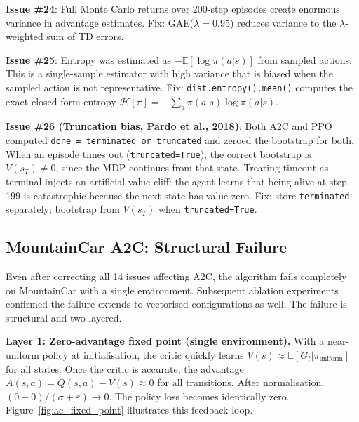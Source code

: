 \documentclass[a4paper,12pt]{article}
\begin{document}
\textbf{Issue \#24}: Full Monte Carlo returns over 200-step episodes create enormous variance in advantage estimates. Fix: GAE($\lambda=0.95$) reduces variance to the $\lambda$-weighted sum of TD errors.

\textbf{Issue \#25}: Entropy was estimated as $-\mathbb{E}[\log\pi(a|s)]$ from sampled actions. This is a single-sample estimator with high variance that is biased when the sampled action is not representative. Fix: \texttt{dist.entropy().mean()} computes the exact closed-form entropy $\mathcal{H}[\pi] = -\sum_a \pi(a|s)\log\pi(a|s)$.

\textbf{Issue \#26 (Truncation bias, Pardo et al., 2018)}: Both A2C and PPO computed \texttt{done = terminated or truncated} and zeroed the bootstrap for both. When an episode times out (\texttt{truncated=True}), the correct bootstrap is $V(s_T) \neq 0$, since the MDP continues from that state. Treating timeout as terminal injects an artificial value cliff: the agent learns that being alive at step 199 is catastrophic because the next state has value zero. Fix: store \texttt{terminated} separately; bootstrap from $V(s_T)$ when \texttt{truncated=True}.

\subsection{MountainCar A2C: Structural Failure}
\label{sec:ac_structural}

Even after correcting all 14 issues affecting A2C, the algorithm fails completely on MountainCar with a single environment. Subsequent ablation experiments confirmed the failure extends to vectorised configurations as well. The failure is structural and two-layered.

\textbf{Layer 1: Zero-advantage fixed point (single environment).} With a near-uniform policy at initialisation, the critic quickly learns $V(s) \approx \mathbb{E}[G_t | \pi_{\text{uniform}}]$ for all states. Once the critic is accurate, the advantage $A(s,a) = Q(s,a) - V(s) \approx 0$ for all transitions. After normalisation, $(0 - 0)/(\sigma + \varepsilon) \rightarrow 0$. The policy loss becomes identically zero. Figure~\ref{fig:ac_fixed_point} illustrates this feedback loop.
\end{document}
